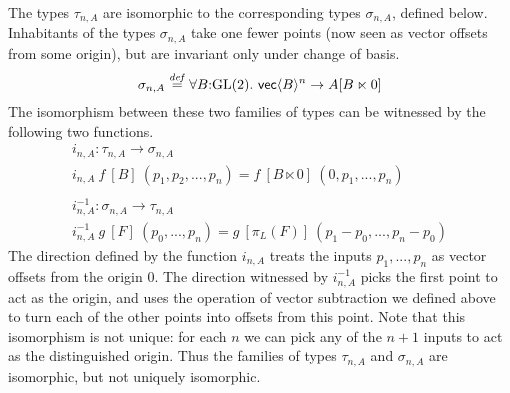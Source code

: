 \begin{example}
  The types $\tau_{n,A}$ are isomorphic to the corresponding types
  $\sigma_{n,A}$, defined below. Inhabitants of the types
  $\sigma_{n,A}$ take one fewer points (now seen as vector offsets
  from some origin), but are invariant only under change of basis.
  \begin{displaymath}
    \sigma_{n,A} \stackrel{\mathit{def}}= \forall B\mathord:\mathrm{GL}(2).\ \mathsf{vec}\langle B \rangle^n \to A[B \ltimes 0]
  \end{displaymath}
  The isomorphism between these two families of types can be witnessed
  by the following two functions.
  \begin{displaymath}
    \begin{array}{l}
      i_{n,A} : \tau_{n,A} \to \sigma_{n,A} \\
      i_{n,A}\ f\ [B]\ (p_1, p_2, ..., p_n) = f\ [B \ltimes 0]\ (0, p_1, ..., p_n) \\
      \\
      i^{-1}_{n,A} : \sigma_{n,A} \to \tau_{n,A} \\
      i^{-1}_{n,A}\ g\ [F]\ (p_0, ..., p_n) = g\ [\pi_L(F)]\ (p_1-p_0, ..., p_n-p_0)
    \end{array}
  \end{displaymath}
  The direction defined by the function $i_{n,A}$ treats the inputs
  $p_1,...,p_n$ as vector offsets from the origin $0$. The direction
  witnessed by $i^{-1}_{n,A}$ picks the first point to act as the
  origin, and uses the operation of vector subtraction we defined
  above to turn each of the other points into offsets from this
  point. Note that this isomorphism is not unique: for each $n$ we can
  pick any of the $n+1$ inputs to act as the distinguished
  origin. Thus the families of types $\tau_{n,A}$ and $\sigma_{n,A}$
  are isomorphic, but not uniquely isomorphic.
\end{example}

